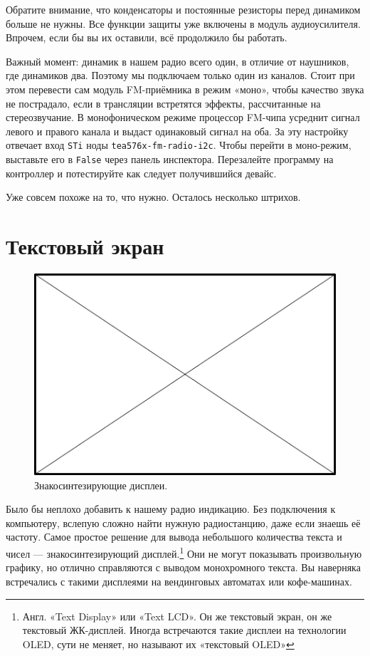 Обратите внимание, что конденсаторы и постоянные резисторы перед динамиком больше не нужны. Все функции защиты уже включены в модуль аудиоусилителя. Впрочем, если бы вы их оставили, всё продолжило бы работать.

Важный момент: динамик в нашем радио всего один, в отличие от наушников, где динамиков два. Поэтому мы подключаем только один из каналов. Стоит при этом перевести сам модуль FM-приёмника в режим «моно», чтобы качество звука не пострадало, если в трансляции встретятся эффекты, рассчитанные на стереозвучание.
В монофоническом режиме процессор FM-чипа усреднит сигнал левого и правого канала и выдаст одинаковый сигнал на оба. За эту настройку отвечает вход \texttt{STi} ноды \texttt{tea576x-fm-radio-i2c}. Чтобы перейти в моно-режим, выставьте его в \texttt{False} через панель инспектора. Перезалейте программу на контроллер и потестируйте как следует получившийся девайс.

Уже совсем похоже на то, что нужно. Осталось несколько штрихов.

\section{Текстовый экран}

\begin{figure}
  \centering
  \includegraphics{TODO}
  \caption{Знакосинтезирующие дисплеи.}
\end{figure}

Было бы неплохо добавить к нашему радио индикацию. Без подключения к компьютеру, вслепую сложно найти нужную радиостанцию, даже если знаешь её частоту. Самое простое решение для вывода небольшого количества текста и чисел — знакосинтезирующий дисплей.\footnote{Англ. «Text Display» или «Text LCD». Он же текстовый экран, он же текстовый ЖК-дисплей. Иногда встречаются такие дисплеи на технологии OLED, сути не меняет, но называют их «текстовый OLED»} Они не могут показывать произвольную графику, но отлично справляются с выводом монохромного текста. Вы наверняка встречались с такими дисплеями на вендинговых автоматах или кофе-машинах.

